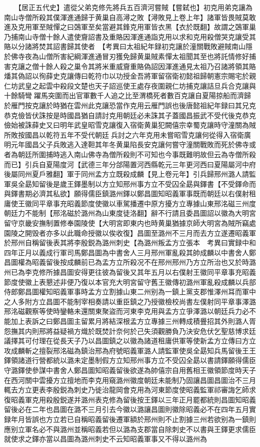 　　【居正五代史】遣從父弟克修先將兵五百濟河嘗賊【嘗弑也】初克用弟克讓為南山寺僧所殺其僕渾進通歸于黄巢自高潯之敗【潯敗見上卷上年】諸軍皆畏賊莫敢進及克用軍至賊憚之曰鵶軍至矣當避其鋒克用軍皆衣黑【衣於既翻】故謂之鵶軍巢乃捕南山寺僧十餘人遣使齎詔書及重賂因渾進通詣克用以求和克用殺僧哭克讓受其賂以分諸將焚其詔書歸其使者　【考異曰太祖紀年録初克讓於潼關戰敗避賊南山隱於佛寺夜為山僧所害紀綱渾進通冒刃獲免歸黄巢賊素憚太祖聞其至也將託情修好捕害克讓之僧十餘人殺之巢令其將米重威齎重賂偽詔因渾進通見太祖乃召諸將領其賂燔其偽詔以徇薛史克讓傳曰乾符巾以功授金吾將軍留宿衛初懿祖歸朝憲宗賜宅於親仁坊武皇之起雲中殺段文楚也天子詔巡使王處存夜圍親仁坊捕克讓詰旦兵合克讓與十餘騎彎躍馬突圍而出官軍數千人追之比至渭橋死者數百克讓自夏陽掠船而濟歸於雁門按克讓於時猶在雲州此克讓恐當作克用云雁門誤也後唐懿祖紀年録曰其兄克恭克儉皆伏誅按是時國昌猶自請討克用朝廷必未誅其子蓋國昌振武不受代後克恭克儉始被誅薛史又曰明年武皇昭雪克讓復入宿衛黄巢犯闕僖宗幸蜀克讓時守潼關為賊所敗按國昌以乾符五年不受代朝廷兵討之六年克用未嘗昭雪克讓何從得入宿衛廣明元年國昌父子兵敗逃入達靼其年冬黄巢陷長安克讓何嘗守潼關戰敗而死於佛寺或者為朝廷所圍捕時逃入南山佛寺為僧所殺則不可知也今事既難明故但云為寺僧所殺而已】引兵自夏陽度河【武德三年分郃陽置河西縣乾元三年更河西曰夏陽屬河中府後屬同州夏戶雅翻】軍于同州孟方立既殺成麟【見上卷元年】引兵歸邢州潞人請監軍吳全勗知留後是歲王鐸墨制以方立知邢州事方立不受囚全勗與鐸書【不受鐸命而與鐸書期必濟其私欲】願得儒臣鎮潞州鐸以鄭昌圖知昭義軍事既而朝廷以右僕射租庸使王徽同平章事充昭義節度使徽以車駕播遷中原方擾方立專據山東邢洺磁三州度朝廷力不能制【邢洺磁於潞州為山東度徒洛翻】辭不行請且委昌圖詔以徽為大明宮留守京畿安撫制置修奉園陵使【大明宮即東内也時黄巢猶據京師大明宮為賊所竊處園陵之開毁者亦多以此職命授徽以俟收復】昌圖至潞州不三月而去方立遂遷昭義軍於邢州自稱留後表其將李殷鋭為潞州刺史【為潞州叛孟方立張本　考異曰實録中和四年正月以義成行軍司馬鄭昌圖為中書舍人三月邢州軍亂殺其帥成麟以中書舍人鄭昌圖權為昭義留後按成麟前已為孟方立所殺况不在邢州邢州乃方立所治也又於時潞州已為李克修所據昌圖安得更往彼為留後又其年五月以右僕射王徽同平章事充昭義節度使徽上表懇述非便乃復以本官充大明宮留守舊王徽傳初潞州軍亂殺成麟以兵部侍郎鄭昌圖權知昭義軍事時孟方立割據山東二州别為一鎮上黨支郡惟澤州耳而軍中之人多附方立昌圖不能制宰相奏請以重臣鎮之乃授徽檢校尚書左僕射同平章事澤潞邢洺磁觀察等使時鑾輅未還關東聚盜而河東李克用與孟方立爭澤潞以朝廷兵力必不能加上表訴之曰鄭昌圖主留累月將結深根孟方立專據三州轉成積舋招其外則潞人胥怨撫其内則邢將益疑禍方熾於既焚計奈何於己失須觀勝負乃決安危伏乞聖慈博求廷議擇其可付理在從長天子乃以昌圖鎮之以徽為諸道租庸供軍等使新孟方立傳曰方立攻成麟斬之擅裂邢洺磁為鎮治邢為府號昭義軍潞人請監軍使吳全勗知兵馬留後王王鐸領諸道行營都統以潞未定墨制假方立知邢州事方立不受囚全勗以書請鐸願得儒臣守潞鐸使參謀中書舍人鄭昌圖知昭義留後欲遂為帥僖宗自用舊相王徽領節度時天子在西河關中雲擾方立擅地而李克用窺潞州徽度朝廷未能制乃固讓昌圖昌圖治不三月輒去方立更表李殷鋭為刺史乃徙治龍岡會克用為河東節度使昭義監軍祁審誨乞師求復昭義軍克用殺殷鋭遂并潞州表克修為留後按王鐸以三年正月罷都統則昌圖知昭義留後必在二年也昌圖在潞不三月引去今徽以潞讓昌圖則徽除昭義必不在四年五月實録年月皆誤也方立若已自稱昭義留後遷軍額於邢州則不止割據三州若欲别為一鎮則應别立軍名必不與潞州並稱昭義若但以潞為支郡當自除刺史不以書與王鐸更求儒臣就使求之鐸亦當以昌圖為潞州刺史不云知昭義軍事又不得以潞州為